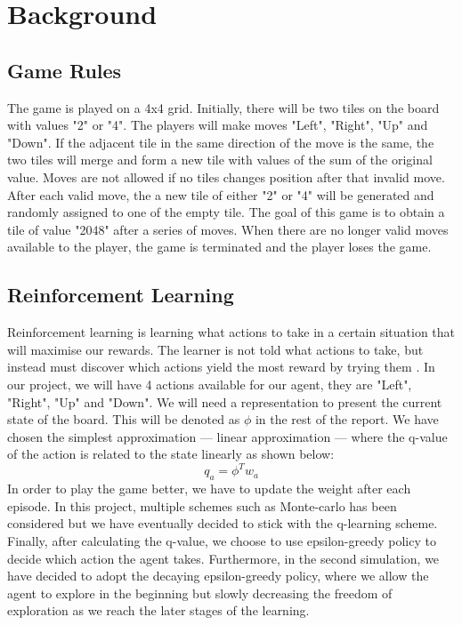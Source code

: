 \section{Background}
\subsection{Game Rules}
The game is played on a 4x4 grid. Initially, there will be two tiles on the board with values "2" or "4".  The players will make moves "Left", "Right", "Up" and "Down". If the adjacent tile in the same direction of the move is the same, the two tiles will merge and form a new tile with values of the sum of the original value. Moves are not allowed if no tiles changes position after that invalid move. After each valid move, the a new tile of either "2" or "4" will be generated and randomly assigned to one of the empty tile. The goal of this game is to obtain a tile of value "2048" after a series of moves. When there are no longer valid moves available to the player, the game is terminated and the player loses the game.

\subsection{Reinforcement Learning}
Reinforcement learning is learning what actions to take in a certain situation  that will maximise our rewards. The learner is not told what actions to take, but instead must discover which actions yield the most reward by trying them \cite{sutton2018reinforcement}.  In our project, we will have 4 actions available for our agent, they are "Left", "Right", "Up" and "Down".  We will need a representation to present the current state of the board. This will be denoted as $\phi$ in the rest of the report. We have chosen the simplest approximation --- linear approximation --- where the q-value of the action  is related to the state linearly as shown below:
\begin{equation*}
q_{a} = \phi ^{T} w_{a}
\end{equation*}
In order to play the game better, we have to update the weight after each episode. In this project, multiple schemes such as Monte-carlo has been considered but we have eventually decided to stick with the q-learning scheme.
\\

Finally, after calculating the q-value, we choose to use epsilon-greedy policy to decide which action the agent takes. Furthermore,  in the second simulation, we have decided to adopt the decaying epsilon-greedy policy, where we allow the agent to explore in the beginning but slowly decreasing the freedom of exploration as we reach the later stages of the learning.
